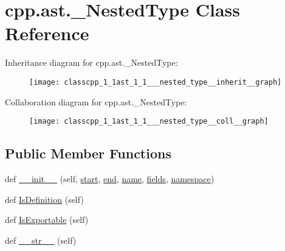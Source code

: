 \hypertarget{classcpp_1_1ast_1_1___nested_type}{}\section{cpp.\+ast.\+\_\+\+Nested\+Type Class Reference}
\label{classcpp_1_1ast_1_1___nested_type}


Inheritance diagram for cpp.\+ast.\+\_\+\+Nested\+Type\+:
\nopagebreak
\begin{figure}[H]
\begin{center}
\leavevmode
\texttt{[image: classcpp\_1\_1ast\_1\_1\_\_\_nested\_type\_\_inherit\_\_graph]}
\end{center}
\end{figure}


Collaboration diagram for cpp.\+ast.\+\_\+\+Nested\+Type\+:
\nopagebreak
\begin{figure}[H]
\begin{center}
\leavevmode
\texttt{[image: classcpp\_1\_1ast\_1\_1\_\_\_nested\_type\_\_coll\_\_graph]}
\end{center}
\end{figure}
\subsection*{Public Member Functions}
\begin{DoxyCompactItemize}
\item 
def \hyperlink{classcpp_1_1ast_1_1___nested_type_a63acff60f38885be6cc11231fffc3f4e}{\+\_\+\+\_\+init\+\_\+\+\_\+} (self, \hyperlink{classcpp_1_1ast_1_1_node_a7b2aa97e6a049bb1a93aea48c48f1f44}{start}, \hyperlink{classcpp_1_1ast_1_1_node_a3c5e5246ccf619df28eca02e29d69647}{end}, \hyperlink{classcpp_1_1ast_1_1___generic_declaration_af774f4729dfd78d0538a6782fe8514c1}{name}, \hyperlink{classcpp_1_1ast_1_1___nested_type_aed69c37a409b4d26e6cfde2de3185d86}{fields}, \hyperlink{classcpp_1_1ast_1_1___generic_declaration_a8aee3f11b37449d54b42a78e0a689f46}{namespace})
\item 
def \hyperlink{classcpp_1_1ast_1_1___nested_type_a9f160999863f39c9032f60b014e213d5}{Is\+Definition} (self)
\item 
def \hyperlink{classcpp_1_1ast_1_1___nested_type_a689f8b0dc20e6070938825eee483dd2f}{Is\+Exportable} (self)
\item 
def \hyperlink{classcpp_1_1ast_1_1___nested_type_a18901ec6acba88c526d703444bf4d52c}{\+\_\+\+\_\+str\+\_\+\+\_\+} (self)
\end{DoxyCompactItemize}
